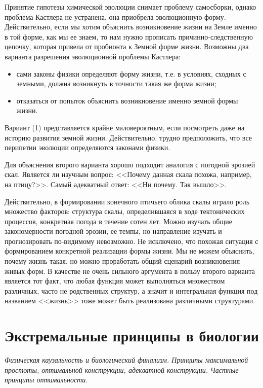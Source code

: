 \documentclass[12pt,a4paper,oneside]{book}
\begin{document}
Принятие гипотезы химической эволюции снимает проблему самосборки, однако проблема Кастлера не устранена, она приобрела эволюционную форму. Действительно, если мы хотим объяснить возникновение жизни на Земле именно в той форме, как мы ее знаем, то нам нужно прописать причинно-следственную цепочку, которая привела от пробионта к Земной форме жизни. Возможны два варианта разрешения эволюционной проблемы Кастлера: 

\begin{itemize}
\item сами законы физики определяют форму жизни, т.е. в условиях, сходных с земными,  должна возникнуть в точности такая же форма жизни;
\item отказаться от попыток объяснить возникновение именно земной формы жизни.
\end{itemize}

Вариант (1) представляется крайне маловероятным, если посмотреть даже на историю развития земной жизни. Действительно, трудно предположить, что все перипетии эволюции определяются законами физики. 

Для объяснения второго варианта хорошо подходит аналогия с погодной эрозией скал. Является ли научным вопрос: <<Почему данная скала похожа, например, на птицу?>>. Самый адекватный ответ: <<Ни почему. Так вышло>>. 

Действительно, в формировании конечного птичьего облика скалы играло роль множество факторов: структура скалы, определившаяся в ходе тектонических процессов, конкретная погода в течение сотен лет. Можно изучать общие закономерности погодной эрозии, ее темпы, но направление изучать и прогнозировать по-видимому невозможно. Не исключено, что похожая ситуация с формированием конкретной реализации формы жизни. Мы не можем объяснить, почему жизнь такая, но можно проработать общий сценарий возникновения живых форм. В качестве не очень сильного аргумента в пользу второго варианта является тот факт, что любая функция может выполняться множеством различных, часто не родственных структур, а значит и интегральная функция под названием <<жизнь>> тоже может быть реализована различными структурами.


\newpage
\section{Экстремальные принципы в биологии}
{\it Физическая каузальность и биологический финализм. Принципы максимальной простоты, оптимальной конструкции, адекватной конструкции. Частные принципы оптимальности.}
\end{document}
